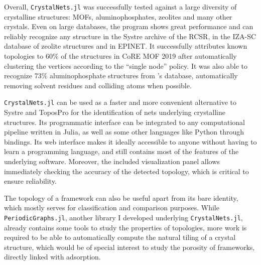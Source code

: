 \documentclass[main.tex]{subfiles}
\begin{document}
Overall, \texttt{CrystalNets.jl} was successfully tested against a large diversity of crystalline structures: MOFs, aluminophosphates, zeolites and many other crystals. Even on large databases, the program shows great performance and can reliably recognize any structure in the Systre archive of the RCSR, in the IZA-SC database of zeolite structures and in EPINET. It successfully attributes known topologies to {60\%} of the structures in CoRE MOF 2019 after automatically clustering the vertices according to the ``single node'' policy. It was also able to recognize {73\%} aluminophosphate structures from \textcite{ALPO}'s database, automatically removing solvent residues and colliding atoms when possible.

\texttt{CrystalNets.jl} can be used as a faster and more convenient alternative to Systre and ToposPro for the identification of nets underlying crystalline structures. Its programmatic interface can be integrated to any computational pipeline written in Julia, as well as some other languages like Python through bindings. %
Its web interface makes it ideally accessible to anyone without having to learn a programming language, and still contains most of the features of the underlying software. Moreover, the included visualization panel allows immediately checking the accuracy of the detected topology, which is critical to ensure reliability.

The topology of a framework can also be useful apart from its bare identity, which mostly serves for classification and comparison purposes. While \texttt{PeriodicGraphs.jl}, another library I developed underlying \texttt{CrystalNets.jl}, already contains some tools to study the properties of topologies, more work is required to be able to automatically compute the natural tiling\autocite{Tiling} of a crystal structure, which would be of special interest to study the porosity of frameworks, directly linked with adsorption.
\end{document}
